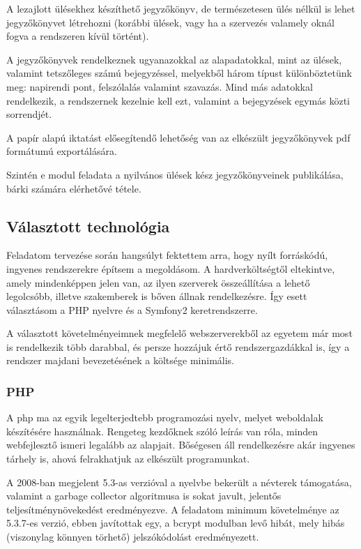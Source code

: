 \documentclass[a4paper,12pt,oneside]{report}
\begin{document}
A lezajlott ülésekhez készíthető jegyzőkönyv, de természetesen ülés nélkül is lehet jegyzőkönyvet létrehozni (korábbi ülések, vagy ha a szervezés valamely oknál fogva a rendszeren kívül történt).

A jegyzőkönyvek rendelkeznek ugyanazokkal az alapadatokkal, mint az ülések, valamint tetszőleges számú bejegyzéssel, melyekből három típust különböztetünk meg: napirendi pont, felszólalás valamint szavazás. Mind más adatokkal rendelkezik, a rendszernek kezelnie kell ezt, valamint a bejegyzések egymás közti sorrendjét.

A papír alapú iktatást elősegítendő lehetőség van az elkészült jegyzőkönyvek pdf formátumú exportálására.

Szintén e modul feladata a nyilvános ülések kész jegyzőkönyveinek publikálása, bárki számára elérhetővé tétele.

\subsection{Választott technológia}

Feladatom tervezése során hangsúlyt fektettem arra, hogy nyílt forráskódú, ingyenes rendszerekre építsem a megoldásom. A hardverköltségtől eltekintve, amely mindenképpen jelen van, az ilyen szerverek összeállítása a lehető legolcsóbb, illetve szakemberek is bőven állnak rendelkezésre. Így esett választásom a PHP nyelvre és a Symfony2 keretrendszerre.

A választott követelményeimnek megfelelő webszerverekből az egyetem már most is rendelkezik több darabbal, és persze hozzájuk értő rendszergazdákkal is, így a rendszer majdani bevezetésének a költsége minimális.

\subsubsection{PHP}

A php ma az egyik legelterjedtebb programozási nyelv, melyet weboldalak készítésére használnak. Rengeteg kezdőknek szóló leírás van róla, minden webfejlesztő ismeri legalább az alapjait. Bőségesen áll rendelkezésre akár ingyenes tárhely is, ahová felrakhatjuk az elkészült programunkat.

A 2008-ban megjelent 5.3-as verzióval a nyelvbe bekerült a névterek támogatása, valamint a garbage collector algoritmusa is sokat javult, jelentős teljesítmény\-növe\-kedést eredményezve. A feladatom minimum követelménye az 5.3.7-es verzió, ebben javítottak egy, a bcrypt modulban levő hibát, mely hibás (viszonylag könnyen törhető) jelszókódolást eredményezett.
\end{document}
